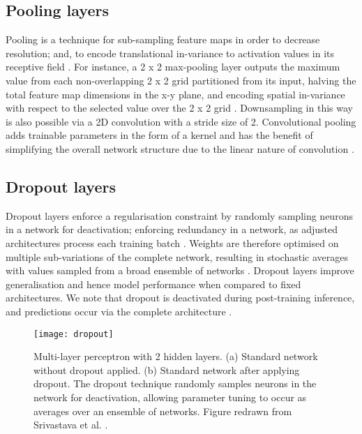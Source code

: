 \subsection{Pooling layers}
Pooling is a technique for sub-sampling feature maps in order to decrease resolution; and, to encode translational in-variance to activation values in its receptive field \cite{Lundervold2019}. For instance, a 2 x 2 max-pooling layer outputs the maximum value from each non-overlapping 2 x 2 grid partitioned from its input, halving the total feature map dimensions in the x-y plane, and encoding spatial in-variance with respect to the selected value over the 2 x 2 grid \cite{Lundervold2019}. Downsampling in this way is also possible via a 2D convolution with a stride size of 2. Convolutional pooling adds trainable parameters in the form of a kernel and has the benefit of simplifying the overall network structure due to the linear nature of convolution \cite{springenberg2014}.

\subsection{Dropout layers}
Dropout layers enforce a regularisation constraint by randomly sampling neurons in a network for deactivation; enforcing redundancy in a network, as adjusted architectures process each training batch \cite{Lundervold2019}. Weights are therefore optimised on multiple sub-variations of the complete network, resulting in stochastic averages with values sampled from a broad ensemble of networks \cite{srivastava2014}. Dropout layers improve generalisation and hence model performance when compared to fixed architectures. We note that dropout is deactivated during post-training inference, and predictions occur via the complete architecture \cite{Lundervold2019}.

\begin{figure}[H]
	\begin{center}
		\texttt{[image: dropout]}
		\caption{Multi-layer perceptron with 2 hidden layers. (a) Standard network without dropout applied. (b) Standard network after applying dropout. The dropout technique randomly samples neurons in the network for deactivation, allowing parameter tuning to occur as averages over an ensemble of networks. Figure redrawn from Srivastava et al. \cite{srivastava2014}.}
		\label{fig:dropout}
	\end{center}
\end{figure}

